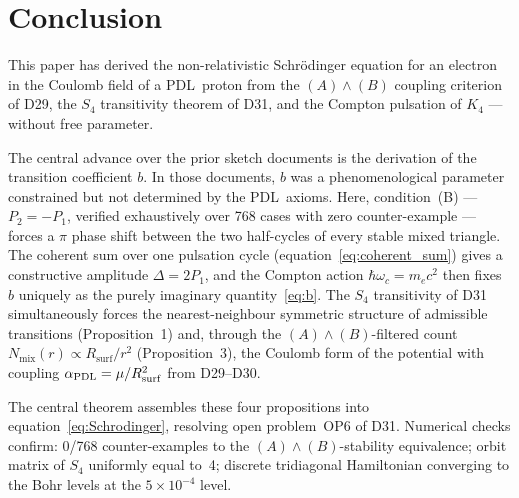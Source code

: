 \documentclass[11pt,a4paper]{article}
\theoremstyle{definition}
\newcommand{\PDL}{\textnormal{PDL}}
\newcommand{\Rsurf}{R_{\mathrm{surf}}}
\newcommand{\hb}{\hbar}
\newcommand{\aPDL}{\alpha_{\PDL}}
\begin{document}
\section*{Conclusion}

This paper has derived the non-relativistic Schr\"odinger equation for an electron in the Coulomb field of a \PDL\ proton from the $(A)\wedge(B)$ coupling criterion of D29, the $S_4$ transitivity theorem of D31, and the Compton pulsation of $K_4$ --- without free parameter.

The central advance over the prior sketch documents is the derivation of the transition coefficient $b$. In those documents, $b$ was a phenomenological parameter constrained but not determined by the \PDL\ axioms. Here, condition~(B) --- $P_2 = -P_1$, verified exhaustively over 768 cases with zero counter-example --- forces a $\pi$ phase shift between the two half-cycles of every stable mixed triangle. The coherent sum over one pulsation cycle (equation~\eqref{eq:coherent_sum}) gives a constructive amplitude $\Delta = 2P_1$, and the Compton action $\hb\omega_c = m_e c^2$ then fixes $b$ uniquely as the purely imaginary quantity~\eqref{eq:b}. The $S_4$ transitivity of D31 simultaneously forces the nearest-neighbour symmetric structure of admissible transitions (Proposition~1) and, through the $(A)\wedge(B)$-filtered count $N_{\mathrm{mix}}(r)\propto\Rsurf/r^2$ (Proposition~3), the Coulomb form of the potential with coupling $\aPDL = \mu/\Rsurf^2$ from D29--D30.

The central theorem assembles these four propositions into equation~\eqref{eq:Schrodinger}, resolving open problem~OP6 of D31. Numerical checks confirm: 0/768 counter-examples to the $(A)\wedge(B)$-stability equivalence; orbit matrix of $S_4$ uniformly equal to~4; discrete tridiagonal Hamiltonian converging to the Bohr levels at the $5\times10^{-4}$ level.



\end{document}
